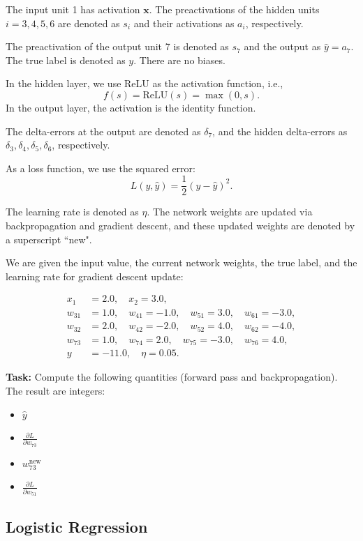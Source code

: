 \documentclass{article}
\begin{document}
The input unit 1 has activation \(\mathbf{x}\). The preactivations of the hidden units \(i = 3, 4, 5, 6\) are denoted as \(s_i\) and their activations as \(a_i\), respectively.

The preactivation of the output unit 7 is denoted as \(s_7\) and the output as \(\hat{y} = a_7\). The true label is denoted as \(y\). There are no biases.

In the hidden layer, we use ReLU as the activation function, i.e.,
\[
f(s) = \text{ReLU}(s) = \max(0, s).
\]
In the output layer, the activation is the identity function.

The delta-errors at the output are denoted as \(\delta_7\), and the hidden delta-errors as \(\delta_3, \delta_4, \delta_5, \delta_6\), respectively.

As a loss function, we use the squared error:
\[
L(y, \hat{y}) = \frac{1}{2}(y - \hat{y})^2.
\]

The learning rate is denoted as \(\eta\). The network weights are updated via backpropagation and gradient descent, and these updated weights are denoted by a superscript ``new".

We are given the input value, the current network weights, the true label, and the learning rate for gradient descent update:

\[
\begin{aligned}
    x_1 &= 2.0, \quad x_2 = 3.0, \\
    w_{31} &= 1.0, \quad w_{41} = -1.0, \quad w_{51} = 3.0, \quad w_{61} = -3.0, \\
    w_{32} &= 2.0, \quad w_{42} = -2.0, \quad w_{52} = 4.0, \quad w_{62} = -4.0, \\
    w_{73} &= 1.0, \quad w_{74} = 2.0, \quad w_{75} = -3.0, \quad w_{76} = 4.0, \\
    y &= -11.0, \quad \eta = 0.05.
\end{aligned}
\]

\textbf{Task:} Compute the following quantities (forward pass and backpropagation). The result are integers:
\begin{itemize}
    \item \(\hat{y}\)
    \item \(\frac{\partial L}{\partial w_{73}}\)
    \item \(w^{\text{new}}_{73}\)
    \item \(\frac{\partial L}{\partial w_{51}}\)
\end{itemize}

\subsection*{Logistic Regression}
\end{document}
